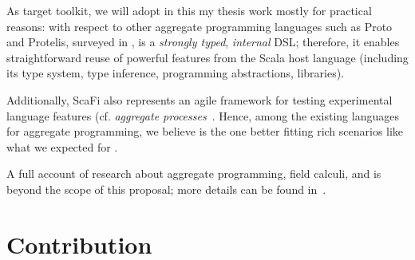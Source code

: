 \documentclass[11pt]{article}
\begin{document}
As target toolkit, we will adopt \scafi{} in this my thesis work mostly for practical reasons: with respect to other aggregate programming languages such as Proto and Protelis, surveyed in \cite{viroli2019jlamp-si-coord},
\scafi{} is a \emph{strongly typed}, \emph{internal} DSL; therefore, it enables straightforward reuse of powerful features from the Scala host language (including its type system, type inference, programming abstractions, libraries).

Additionally, ScaFi also represents an agile framework for testing experimental language features (cf. \emph{aggregate processes}~\cite{DBLP:journals/eaai/CasadeiVAPD21}.
%
Hence, among the existing languages for aggregate programming, we believe \scafi{} is the one better fitting rich scenarios like what we expected for \cpsw{}.

A full account of research about aggregate programming, field calculi, and \scafi{} is beyond the scope of this proposal; more details can be found in~\cite{viroli2019jlamp-si-coord,DBLP:journals/eaai/CasadeiVAPD21}.

\section{Contribution} \label{contribution}
\end{document}
